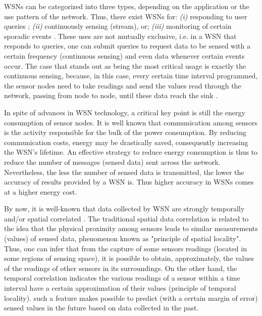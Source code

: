 \documentclass[conference]{IEEEtran}
\begin{document}
WSNs can be categorized into three types, depending on the application or the
use pattern of the network. Thus, there exist WSNs for: {\it (i)} responding to
user queries \cite{Brayner2007}; {\it (ii)} continuously sensing (stream), or;
{\it (iii)} monitoring of certain sporadic events \cite{Ren2007}. These uses are
not mutually exclusive, i.e. in a WSN that responds to queries, one can submit
queries to request data to be sensed with a certain frequency (continuous
sensing) and even data whenever certain events occur. The case that stands out
as being the most critical usage is exactly the continuous sensing, because, in
this case, every certain time interval programmed, the sensor nodes need to take
readings and send the values read through the network, passing from node to
node, until these data reach the sink \cite{Villas2012}.


In spite of advances in WSN technology, a critical key point is still the
energy consumption of sensor nodes. It is well known that communication among
sensors is the activity responsible for the bulk of the power consumption. By
reducing communication costs, energy may be drastically saved, consequently
increasing the WSN's lifetime. An effective strategy to reduce energy
consumption is thus to reduce the number of messages (sensed data) sent across
the network. Nevertheless, the less the number of sensed data is transmitted,
the lower the accuracy of results provided by a WSN is. Thus higher accuracy in
WSNs comes at a higher energy cost.

By now, it is well-known that data collected by WSN are strongly temporally
and/or spatial correlated \cite{Yoon2005, Chu2006}. The traditional spatial data
correlation is related to the idea that the physical proximity among sensors
leads to similar measurements (values) of sensed data, phenomenon known as
"principle of spatial locality". Thus, one can infer that from the capture of
some sensors readings (located in some regions of sensing space), it is possible
to obtain, approximately, the values of the readings of other sensors in its
surroundings. On the other hand, the temporal correlation indicates  the various
readings of a sensor within a time interval have a certain approximation of
their values (principle of temporal locality). such a feature makes possible to
predict (with a certain margin of error) sensed values in the future based on
data collected in the past.
\end{document}
